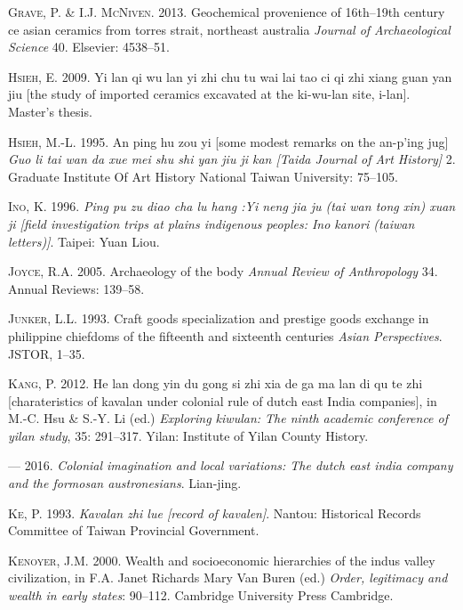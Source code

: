 \documentclass[]{article}
\begin{document}
\leavevmode\hypertarget{ref-Grave2013}{}%
\textsc{Grave}, P. \& I.J. \textsc{McNiven}. 2013. Geochemical
provenience of 16th--19th century ce asian ceramics from torres strait,
northeast australia \emph{Journal of Archaeological Science} 40.
Elsevier: 4538--51.

\leavevmode\hypertarget{ref-Hsieh2009}{}%
\textsc{Hsieh}, E. 2009. Yi lan qi wu lan yi zhi chu tu wai lai tao ci
qi zhi xiang guan yan jiu {[}the study of imported ceramics excavated at
the ki-wu-lan site, i-lan{]}. Master's thesis.

\leavevmode\hypertarget{ref-Hsieh1995}{}%
\textsc{Hsieh}, M.-L. 1995. An ping hu zou yi {[}some modest remarks on
the an-p'ing jug{]} \emph{Guo li tai wan da xue mei shu shi yan jiu ji
kan {[}Taida Journal of Art History{]}} 2. Graduate Institute Of Art
History National Taiwan University: 75--105.

\leavevmode\hypertarget{ref-Ino1996}{}%
\textsc{Ino}, K. 1996. \emph{Ping pu zu diao cha lu hang :Yi neng jia ju
(tai wan tong xin) xuan ji {[}field investigation trips at plains
indigenous peoples: Ino kanori (taiwan letters){]}}. Taipei: Yuan Liou.

\leavevmode\hypertarget{ref-Joyce2005}{}%
\textsc{Joyce}, R.A. 2005. Archaeology of the body \emph{Annual Review
of Anthropology} 34. Annual Reviews: 139--58.

\leavevmode\hypertarget{ref-Junker1993}{}%
\textsc{Junker}, L.L. 1993. Craft goods specialization and prestige
goods exchange in philippine chiefdoms of the fifteenth and sixteenth
centuries \emph{Asian Perspectives}. JSTOR, 1--35.

\leavevmode\hypertarget{ref-Kang2012}{}%
\textsc{Kang}, P. 2012. He lan dong yin du gong si zhi xia de ga ma lan
di qu te zhi {[}charateristics of kavalan under colonial rule of dutch
east India companies{]}, in M.-C. Hsu \& S.-Y. Li (ed.) \emph{Exploring
kiwulan: The ninth academic conference of yilan study}, 35: 291--317.
Yilan: Institute of Yilan County History.

\leavevmode\hypertarget{ref-Kang2016}{}%
--- 2016. \emph{Colonial imagination and local variations: The dutch
east india company and the formosan austronesians}. Lian-jing.

\leavevmode\hypertarget{ref-Ke1993}{}%
\textsc{Ke}, P. 1993. \emph{Kavalan zhi lue {[}record of kavalen{]}}.
Nantou: Historical Records Committee of Taiwan Provincial Government.

\leavevmode\hypertarget{ref-Kenoyer2000}{}%
\textsc{Kenoyer}, J.M. 2000. Wealth and socioeconomic hierarchies of the
indus valley civilization, in F.A. Janet Richards Mary Van Buren (ed.)
\emph{Order, legitimacy and wealth in early states}: 90--112. Cambridge
University Press Cambridge.
\end{document}
